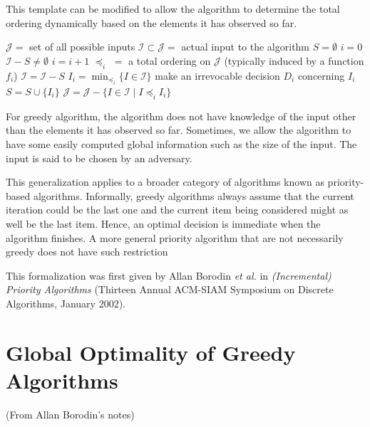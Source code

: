 This template can be modified to allow the algorithm to determine the total ordering dynamically based on the elements it has observed so far.

\begin{codebox}
    \li $\mathcal{J} =$ set of all possible inputs
    \li $\mathcal{I} \subset \mathcal{J} = $ actual input to the algorithm
    \li $S = \emptyset$ 
    \li $i = 0$
    \li \While $\mathcal{I} - S \neq \emptyset$ \Do
        \li $i = i + 1$
        \li $\preceq_i\,\, = $ a total ordering on $\mathcal{J}$ (typically induced by a function $f_i$)
        \li $\mathcal{I} = \mathcal{I} - S$
        \li $I_i = \min_{\preceq_i} \{ I \in \mathcal{I} \}$ 
        \li make an irrevocable decision $D_i$ concerning $I_i$ 
        \li $S = S \cup \{I_i\}$
        \li $\mathcal{J} = \mathcal{J} - \{I \in \mathcal{I} \mid I \preceq_i I_i \}$
    \End      
\end{codebox}

For greedy algorithm, the algorithm does not have knowledge of the input other than the elements it has observed so far. Sometimes, we allow the algorithm to have some easily computed global information such as the size of the input. The input is said to be chosen by an adversary.

This generalization applies to a broader category of algorithms known as priority-based algorithms. Informally, greedy algorithms always assume that the current iteration could be the last one and the current item being considered might as well be the last item. Hence, an optimal decision is immediate when the algorithm finishes. A more general priority algorithm that are not necessarily greedy does not have such restriction

This formalization was first given by Allan Borodin \textit{et al.} in \textit{(Incremental) Priority Algorithms} (Thirteen Annual ACM-SIAM Symposium on Discrete Algorithms, January 2002).

\section{Global Optimality of Greedy Algorithms}

(From Allan Borodin's notes)


